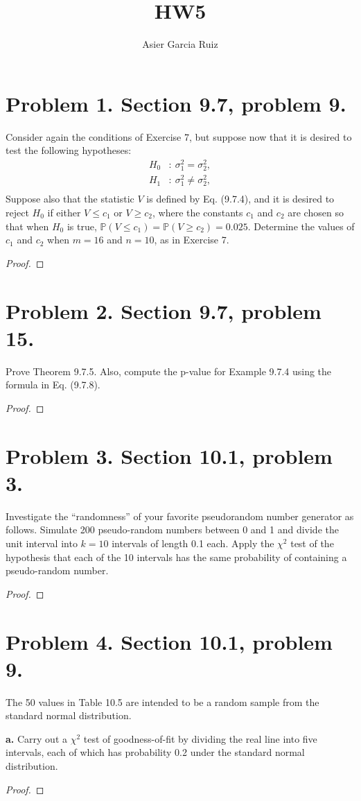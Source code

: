 \documentclass{article}
\title{HW5}
\author{Asier Garcia Ruiz}
\renewcommand{\P}[1]{\mathbb{P}\left(#1\right)}
\newenvironment{hwproof}[1]
{
    #1
    \begin{proof}
}{
    \end{proof}
}
\begin{document}
\maketitle
\section*{Problem 1. Section 9.7, problem 9.}
\begin{hwproof}
    {
        Consider again the conditions of Exercise 7, but suppose now that it is
        desired to test the following hypotheses:
        \begin{align*}
            H_0 & :\ \sigma_1^2 = \sigma_2^2,    \\
            H_1 & :\ \sigma_1^2 \neq \sigma_2^2, \\
        \end{align*}
        Suppose also that the statistic $V$ is defined by Eq. (9.7.4), and it is
        desired to reject $H_0$ if either $V \leq c_1$ or $V \geq c_2$, where
        the constants $c_1$ and $c_2$ are chosen so that when $H_0$ is true,
        $\P{V \leq c_1} = \P{V \geq c_2} = 0.025$. Determine the values of $c_1$
        and $c_2$ when $m=16$ and $n=10$, as in Exercise 7.
    }
\end{hwproof}

\section{Problem 2. Section 9.7, problem 15.}
\begin{hwproof}
    {
        Prove Theorem 9.7.5. Also, compute the p-value for Example 9.7.4 using the
        formula in Eq. (9.7.8).
    }
\end{hwproof}

\section{Problem 3. Section 10.1, problem 3.}
\begin{hwproof}
    {
        Investigate the “randomness” of your favorite pseudorandom number generator
        as follows. Simulate 200 pseudo-random numbers between 0 and 1 and divide
        the unit interval into $k = 10$ intervals of length 0.1 each. Apply the
        $\chi^2$ test of the hypothesis that each of the 10 intervals has the
        same probability of containing a pseudo-random number.
    }
\end{hwproof}

\section*{Problem 4. Section 10.1, problem 9.}
\begin{hwproof}
    {
        The 50 values in Table 10.5 are intended to be a random sample from the
        standard normal distribution.

        \textbf{a.}
        Carry out a $\chi^2$ test of goodness-of-fit by dividing the real line
        into five intervals, each of which has probability 0.2 under the standard
        normal distribution.
    }
\end{hwproof}
\end{document}
